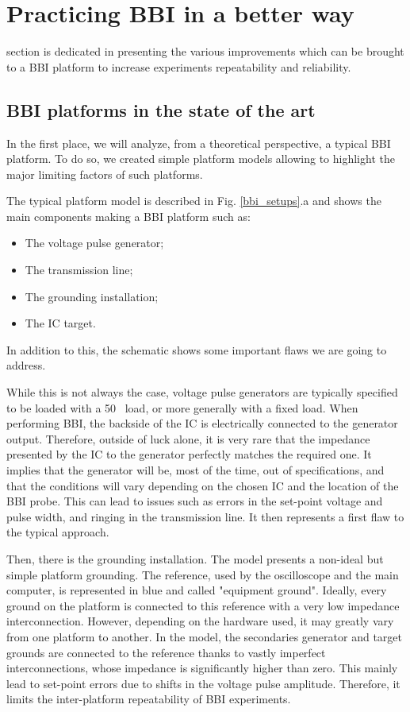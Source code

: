 
\section{Practicing BBI in a better way}
	 section is dedicated in presenting the various improvements which can be brought to a BBI platform to increase experiments repeatability and reliability.
	\subsection{BBI platforms in the state of the art}
		In the first place, we will analyze, from a theoretical perspective, a typical BBI platform.
		To do so, we created simple platform models allowing to highlight the major limiting factors of such platforms.
		
		The typical platform model is described in Fig. \ref{bbi_setups}.a and shows the main components making a BBI platform such as:
		\begin{itemize}
			\item The voltage pulse generator;
			\item The transmission line;
			\item The grounding installation;
			\item The IC target.
		\end{itemize}
		In addition to this, the schematic shows some important flaws we are going to address.

		While this is not always the case, voltage pulse generators are typically specified to be loaded with a 50 \textOmega\ load, or more generally with a fixed load.
		When performing BBI, the backside of the IC is electrically connected to the generator output.
		Therefore, outside of luck alone, it is very rare that the impedance presented by the IC to the generator perfectly matches the required one.
		It implies that the generator will be, most of the time, out of specifications, and that the conditions will vary depending on the chosen IC and the location of the BBI probe.
		This can lead to issues such as errors in the set-point voltage and pulse width, and ringing in the transmission line.
		It then represents a first flaw to the typical approach.

		Then, there is the grounding installation.
		The model presents a non-ideal but simple platform grounding.
		The reference, used by the oscilloscope and the main computer, is represented in blue and called "equipment ground".
		Ideally, every ground on the platform is connected to this reference with a very low impedance interconnection.
		However, depending on the hardware used, it may greatly vary from one platform to another.
		In the model, the secondaries generator and target grounds are connected to the reference thanks to vastly imperfect interconnections, whose impedance is significantly higher than zero.
		This mainly lead to set-point errors due to shifts in the voltage pulse amplitude.
		Therefore, it limits the inter-platform repeatability of BBI experiments.

